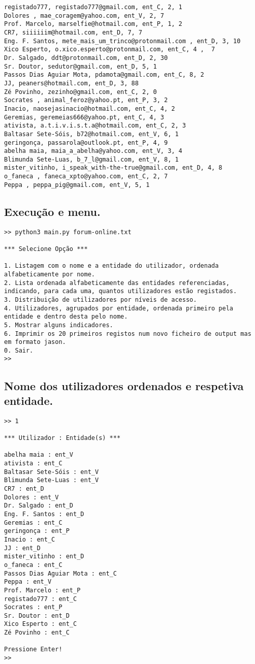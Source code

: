 \documentclass[11pt,a4paper]{report}%
\begin{document}
\begin{verbatim}
registado777, registado777@gmail.com, ent_C, 2, 1
Dolores , mae_coragem@yahoo.com, ent_V, 2, 7
Prof. Marcelo, marselfie@hotmail.com, ent_P, 1, 2
CR7, siiiiiim@hotmail.com, ent_D, 7, 7
Eng. F. Santos, mete_mais_um_trinco@protonmail.com , ent_D, 3, 10
Xico Esperto, o.xico.esperto@protonmail.com, ent_C, 4 ,  7
Dr. Salgado, ddt@protonmail.com, ent_D, 2, 30
Sr. Doutor, sedutor@gmail.com, ent_D, 5, 1
Passos Dias Aguiar Mota, pdamota@gmail.com, ent_C, 8, 2
JJ, peaners@hotmail.com, ent_D, 3, 88
Zé Povinho, zezinho@gmail.com, ent_C, 2, 0
Socrates , animal_feroz@yahoo.pt, ent_P, 3, 2
Inacio, naosejasinacio@hotmail.com, ent_C, 4, 2
Geremias, geremeias666@yahoo.pt, ent_C, 4, 3
ativista, a.t.i.v.i.s.t.a@hotmail.com, ent_C, 2, 3
Baltasar Sete-Sóis, b72@hotmail.com, ent_V, 6, 1
geringonça, passarola@outlook.pt, ent_P, 4, 9
abelha maia, maia_a_abelha@yahoo.com, ent_V, 3, 4
Blimunda Sete-Luas, b_7_l@gmail.com, ent_V, 8, 1
mister_vitinho, i_speak_with-the-true@gmail.com, ent_D, 4, 8
o_faneca , faneca_xpto@yahoo.com, ent_C, 2, 7
Peppa , peppa_pig@gmail.com, ent_V, 5, 1 
\end{verbatim}


\subsection{Execução e menu.}
\begin{small}
\begin{verbatim}
>> python3 main.py forum-online.txt

*** Selecione Opção ***

1. Listagem com o nome e a entidade do utilizador, ordenada alfabeticamente por nome.
2. Lista ordenada alfabeticamente das entidades referenciadas, indicando, para cada uma, quantos utilizadores estão registados.
3. Distribuição de utilizadores por níveis de acesso.
4. Utilizadores, agrupados por entidade, ordenada primeiro pela entidade e dentro desta pelo nome.
5. Mostrar alguns indicadores.
6. Imprimir os 20 primeiros registos num novo ficheiro de output mas em formato jason.
0. Sair.
>> 
\end{verbatim}
\end{small}

\subsection{Nome dos utilizadores ordenados e respetiva entidade.}

\begin{verbatim}
>> 1

*** Utilizador : Entidade(s) ***

abelha maia : ent_V
ativista : ent_C
Baltasar Sete-Sóis : ent_V
Blimunda Sete-Luas : ent_V
CR7 : ent_D
Dolores : ent_V
Dr. Salgado : ent_D
Eng. F. Santos : ent_D
Geremias : ent_C
geringonça : ent_P
Inacio : ent_C
JJ : ent_D
mister_vitinho : ent_D
o_faneca : ent_C
Passos Dias Aguiar Mota : ent_C
Peppa : ent_V
Prof. Marcelo : ent_P
registado777 : ent_C
Socrates : ent_P
Sr. Doutor : ent_D
Xico Esperto : ent_C
Zé Povinho : ent_C

Pressione Enter!
>> 
\end{verbatim}
\end{document}
